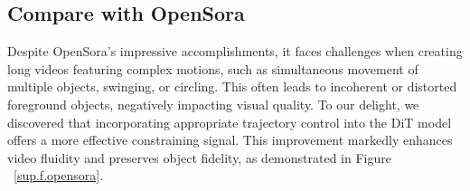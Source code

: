 

\subsection{Compare with OpenSora}

Despite OpenSora's impressive accomplishments, it faces challenges when creating long videos featuring complex motions, such as simultaneous movement of multiple objects, swinging, or circling. This often leads to incoherent or distorted foreground objects, negatively impacting visual quality. To our delight, we discovered that incorporating appropriate trajectory control into the DiT model offers a more effective constraining signal. This improvement markedly enhances video fluidity and preserves object fidelity, as demonstrated in Figure ~\ref{sup.f.opensora}.

